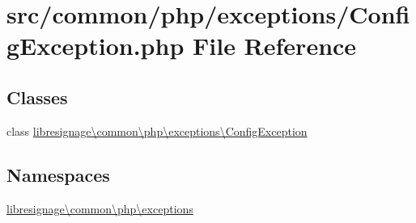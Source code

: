 \hypertarget{ConfigException_8php}{}\section{src/common/php/exceptions/\+Config\+Exception.php File Reference}
\label{ConfigException_8php}
\subsection*{Classes}
\begin{DoxyCompactItemize}
\item 
class \hyperlink{classlibresignage_1_1common_1_1php_1_1exceptions_1_1ConfigException}{libresignage\textbackslash{}common\textbackslash{}php\textbackslash{}exceptions\textbackslash{}\+Config\+Exception}
\end{DoxyCompactItemize}
\subsection*{Namespaces}
\begin{DoxyCompactItemize}
\item 
 \hyperlink{namespacelibresignage_1_1common_1_1php_1_1exceptions}{libresignage\textbackslash{}common\textbackslash{}php\textbackslash{}exceptions}
\end{DoxyCompactItemize}
